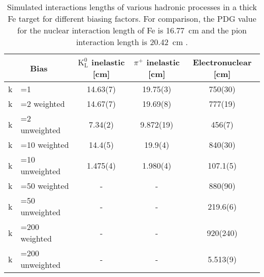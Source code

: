 \begin{table}[htbp]
	\centering
	\caption[Simulated interactions lengths of various hadronic processes in a thick Fe target for different biasing factors.]{Simulated interactions lengths of various hadronic processes in a thick Fe target for different biasing factors. For comparison, the PDG value for the nuclear interaction length of Fe is \SI{16.77}{\centi\metre} and the pion interaction length is \SI{20.42}{\centi\metre} \cite{nist-database}.}
	\begin{tabular}{r@{}l|c|c|c}
		\toprule
		\multicolumn{2}{c|}{Bias} & $\mathrm{K^0_L}$ inelastic [cm]& $\pi^+$ inelastic [cm]& Electronuclear [cm]\\
		\midrule
		k&=1 & 14.63(7) & 19.75(3)  & 750(30)\\
		k&=2 weighted & 14.67(7) & 19.69(8)& 777(19)\\
		k&=2 unweighted & 7.34(2) & 9.872(19) & 456(7)\\
		k&=10 weighted & 14.4(5) & 19.9(4) & 840(30) \\
		k&=10 unweighted & 1.475(4) & 1.980(4) & 107.1(5)\\
		k&=50 weighted & - & - & 880(90) \\
		k&=50 unweighted & - & - & 219.6(6)\\
		k&=200 weighted & - & - & 920(240) \\
		k&=200 unweighted & - & - & 5.513(9)\\
		\bottomrule
	\end{tabular}
	\label{res:Tab:meanfreepaths}
\end{table}

